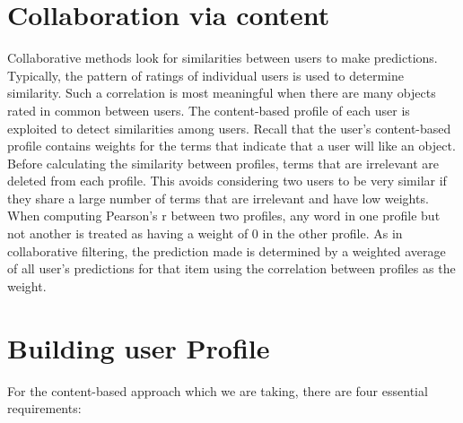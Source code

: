 \section{Collaboration via content}
Collaborative methods look for similarities between users to make predictions. Typically, the pattern of ratings of individual users is used to determine similarity. Such a correlation is most meaningful when there are many objects rated in common between users.
The content-based profile of each user is exploited to detect similarities among users. Recall that the user’s content-based profile contains weights for the terms that indicate that a user will like an object. Before calculating the similarity between profiles, terms that are irrelevant are deleted from each profile. This avoids considering two users to be very similar if they share a large number of terms that are irrelevant and have low weights. When computing Pearson’s r between two profiles, any word in one profile but not another is treated as having a weight of 0 in the other profile. As in collaborative filtering, the prediction made is determined by a weighted average of all user’s predictions for that item using the correlation between profiles as the weight.

\section{Building user Profile}
For the content-based approach which we are taking, there are four essential requirements:

